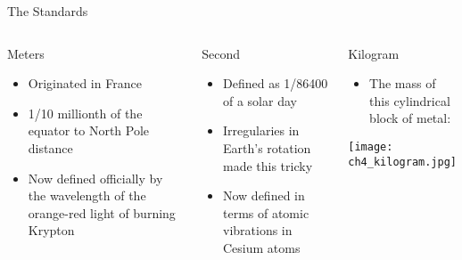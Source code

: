 \documentclass[pdf, aspectratio=169]{beamer}
\begin{document}
\begin{frame}{The Standards}
  \vspace{-6mm}
  \begin{columns}[t]
	\begin{block}{Meters}
	  \begin{itemize}
		\item Originated in France
		\item 1/10 millionth of the equator to North Pole distance
		\item Now defined officially by the wavelength of the orange-red light of burning Krypton
	  \end{itemize}
	\end{block}
	\begin{block}{Second}
	  \begin{itemize}
		\item Defined as 1/86400 of a solar day
		\item Irregularies in Earth's rotation made this tricky
		\item Now defined in terms of atomic vibrations in Cesium atoms
	  \end{itemize}
	\end{block}
	\begin{block}{Kilogram}
	  \begin{itemize}
		\item The mass of this cylindrical block of metal:
	  \end{itemize}
	  \begin{center}
		\texttt{[image: ch4\_kilogram.jpg]}
	  \end{center}
	\end{block}
  \end{columns}
\end{frame}
\end{document}
